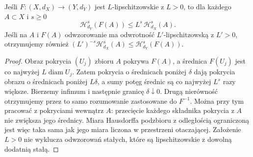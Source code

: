 \begin{lemat}
\label{lem:hausdorff-lipschitz}
Jeśli $F:(X,d_X)\to(Y,d_Y)$ jest
$L$-lipschitzowskie z $L>0$, to dla każdego $A\subset X$
i $s\geq0$
\[
 \mathcal H^s_{d_Y}(F(A))
 \leq L^s\,\mathcal H^s_{d_X}(A).
\]
Jeśli na $A$ i $F(A)$ odwzorowanie ma odwrotność
$L'$-lipschitzowską z $L'>0$, otrzymujemy również
$(L')^{-s}\mathcal H^s_{d_X}(A)
\leq\mathcal H^s_{d_Y}(F(A))$.
\end{lemat}
\begin{proof}
Obraz pokrycia $(U_j)$ zbioru $A$ pokrywa $F(A)$,
a średnica $F(U_j)$ jest co najwyżej
$L\operatorname{diam}U_j$.
Zatem pokrycia o średnicach poniżej
$\delta$ dają pokrycia obrazu o średnicach
poniżej $L\delta$, a sumy potęg średnic
są co najwyżej $L^s$ razy większe.
Bierzemy infimum i następnie granicę
$\delta\downarrow0$. Drugą nierówność
otrzymujemy przez to samo rozumowanie
zastosowane do $F^{-1}$. Można przy tym pracować
z pokryciami wewnątrz $A$: przecięcie każdego składnika
pokrycia z $A$ nie zwiększa jego średnicy. Miara
Hausdorffa podzbioru z odległością ograniczoną jest
więc taka sama jak jego miara liczona w przestrzeni
otaczającej. Założenie $L>0$ nie wyklucza odwzorowań stałych,
które są lipschitzowskie z dowolną dodatnią stałą.
\end{proof}

